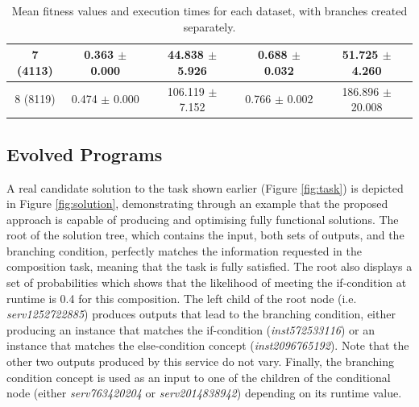 \documentclass[conference]{IEEEtran}
\begin{document}
\begin{table}
{\begin{tabular}{c|c|c|c|c|}
\multicolumn{1}{|c|}{7 (4113)}            & 0.363 $\pm$ 0.000                          & 44.838 $\pm$ 5.926                          & 0.688 $\pm$ 0.032                          & 51.725 $\pm$ 4.260                          \\ \hline
\multicolumn{1}{|c|}{8 (8119)}            & 0.474 $\pm$ 0.000                          & 106.119 $\pm$ 7.152                         & 0.766 $\pm$ 0.002                          & 186.896 $\pm$ 20.008                        \\ \hline
\end{tabular}
}
\vspace{0.3cm}
\caption{Mean fitness values and execution times for each dataset, with branches created separately.}
\label{resultsTable2}
\end{table}

\subsection{Evolved Programs}

A real candidate solution to the task shown earlier (Figure \ref{fig:task}) is depicted in Figure \ref{fig:solution}, demonstrating through an example that the proposed approach is capable of producing and optimising fully functional solutions. The root of the solution tree, which contains the input, both sets of outputs, and the branching condition, perfectly matches the information requested in the composition task, meaning that the task is fully satisfied. The root also displays a set of probabilities which shows that the likelihood of meeting the if-condition at runtime is 0.4 for this composition. The left child of the root node (i.e. \textit{serv1252722885}) produces outputs that lead to the branching condition, either producing an instance that matches the if-condition (\textit{inst572533116}) or an instance that matches the else-condition concept (\textit{inst2096765192}). Note that the other two outputs produced by this service do not vary. Finally, the branching condition concept is used as an input to one of the children of the conditional node (either \textit{serv763420204} or \textit{serv2014838942}) depending on its runtime value.
\end{document}
